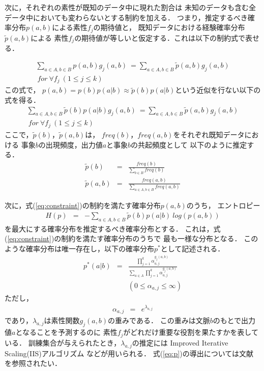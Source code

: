 次に，それぞれの素性が既知のデータ中に現れた割合は
未知のデータも含む全データ中においても変わらないとする制約を加える．
つまり，推定するべき確率分布$p(a,b)$による素性$f_j$の期待値と，
既知データにおける経験確率分布$\tilde{p}(a,b)$による
素性$f_j$の期待値が等しいと仮定する．これは以下の制約式で表せる．

{\it
\begin{eqnarray}
  \label{eq:constraint0}
  \sum_{a\in A,b\in B}p(a,b)g_{j}(a,b) 
  \ = \sum_{a\in A,b\in B}\tilde{p}(a,b)g_{j}(a,b)\\
  \ for\ \forall f_{j}\ (1\leq j \leq k) \nonumber
\end{eqnarray}
}
この式で，
$p(a,b)=p(b)p(a|b)\approx\tilde{p}(b)p(a|b)$という近似を行ない以下の式を得る．
{\it
\begin{eqnarray}
  \label{eq:constraint}
  \sum_{a\in A,b\in B}\tilde{p}(b)p(a|b)g_{j}(a,b) 
  \ = \sum_{a\in A,b\in B}\tilde{p}(a,b)g_{j}(a,b)\\
  \ for\ \forall f_{j}\ (1\leq j \leq k) \nonumber
\end{eqnarray}
}
ここで，$\tilde{p}(b)$，$\tilde{p}(a,b)$は，
$freq(b)$，$freq(a,b)$をそれぞれ既知データにおける
事象$b$の出現頻度，出力値$a$と事象$b$の共起頻度として
以下のように推定する．
{\it
\begin{eqnarray}
  \tilde{p}(b) & = & 
  \frac{freq(b)}{\displaystyle\sum_{b\in B} freq(b)}\\
  \tilde{p}(a,b) & = & 
  \frac{freq(a,b)}{\displaystyle\sum_{a\in A,b\in B} freq(a,b)}
\end{eqnarray}
}

次に，式(\ref{eq:constraint})の制約を満たす確率分布$p(a,b)$のうち，
エントロピー
{\it
\begin{eqnarray}
  \label{eq:entropy}
  H(p) & = & -\sum_{a\in A,b\in B}\tilde{p}(b)p(a|b)\ log\left(p(a,b)\right)
\end{eqnarray}
}
を最大にする確率分布を推定するべき確率分布とする．
これは，式(\ref{eq:constraint})の制約を満たす確率分布のうちで
最も一様な分布となる．
このような確率分布は唯一存在し，以下の確率分布$p^{*}$として記述される．
{\it
\begin{eqnarray}
  \label{eq:p}
  p^{*}(a|b) & = & \frac{\prod_{j=1}^{k}\alpha_{a,j}^{g_{j}(a,b)}}
  {\sum_{a\in A} \prod_{j=1}^{k}\alpha_{a,j}^{g_{j}(a,b)}}\\
  & & (0\leq \alpha_{a,j}\leq \infty)\nonumber
\end{eqnarray}
}
ただし，
{\it
\begin{eqnarray}
  \label{eq:alpha}
  \alpha_{a,j} & = & e^{\lambda_{a,j}}
\end{eqnarray}
}
であり，$\lambda_{a,j}$は素性関数$g_{j}(a,b)$の重みである．
この重みは文脈$b$のもとで出力値$a$となることを予測するのに
素性$f_{j}$がどれだけ重要な役割を果たすかを表している．
訓練集合が与えられたとき，$\lambda_{a,j}$の推定には
Improved Iterative Scaling(IIS)アルゴリズム
\cite{pietra95}
などが用いられる．
式(\ref{eq:p})の導出については文献
\cite{Jaynes:57,Jaynes:79}
を参照されたい．

